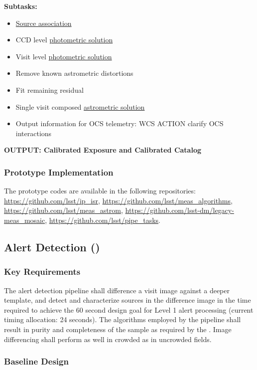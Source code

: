 \noindent
{\bf Subtasks:}
\begin{itemize}
\item \hyperref[sec:association]{Source association}
\item CCD level \hyperref[sec:photometric]{photometric solution}
\item Visit level \hyperref[sec:photometric]{photometric solution}
\item Remove known astrometric distortions
\item Fit remaining residual
\item Single visit composed \hyperref[sec:astrometric]{astrometric solution}
\item Output information for OCS telemetry: WCS ACTION clarify OCS interactions
\end{itemize}

\noindent
{\bf OUTPUT: Calibrated Exposure and Calibrated Catalog}

\subsubsection{Prototype Implementation}

The prototype codes are available in the following repositories: \url{https://github.com/lsst/ip_isr}, \url{https://github.com/lsst/meas_algorithms}, \url{https://github.com/lsst/meas_astrom}, \url{https://github.com/lsst-dm/legacy-meas_mosaic}, \url{https://github.com/lsst/pipe_tasks}.

\clearpage

\subsection{Alert Detection (\wbsDiffim)}

\subsubsection{Key Requirements}

The alert detection pipeline shall difference a visit image against a deeper template, and detect and characterize sources in the difference image in the time required to achieve the 60 second design goal for Level 1 alert processing (current timing allocation: 24 seconds). The algorithms employed by the pipeline shall result in purity and completeness of the sample as required by the \DMSR\@. Image differencing shall perform as well in crowded as in uncrowded fields.

\subsubsection{Baseline Design}
\label{sec:diffimDesign}

